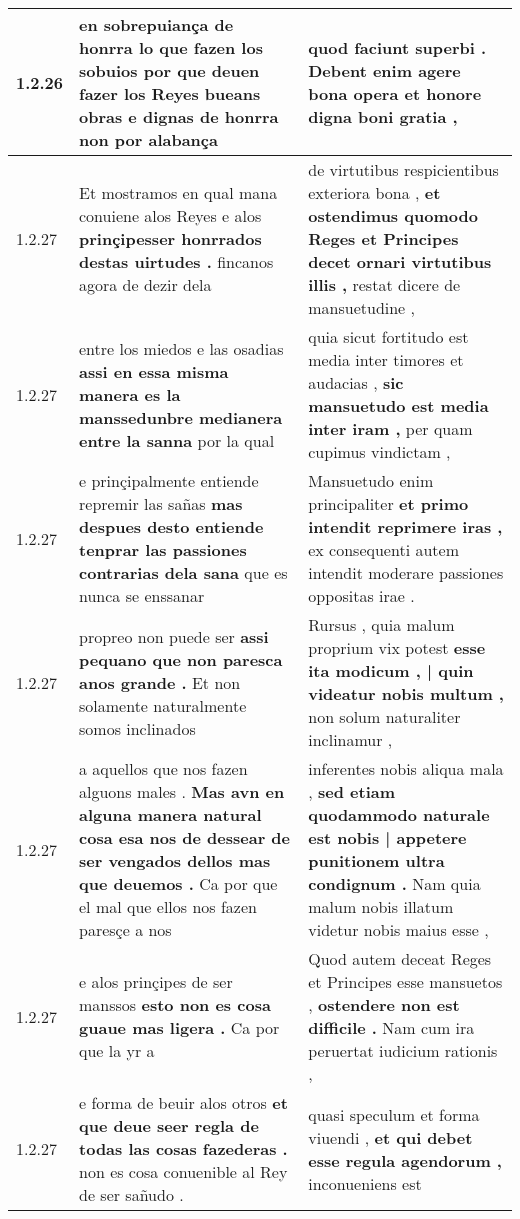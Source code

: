 \begin{tabular}{|p{1cm}|p{6.5cm}|p{6.5cm}|}
1.2.26 & en sobrepuiança de honrra lo que fazen los sobuios \textbf{ por que deuen fazer los Reyes bueans obras e dignas de honrra } non por alabança & quod faciunt superbi . \textbf{ Debent enim agere bona opera } et honore digna boni gratia , \\\hline
1.2.27 & Et mostramos en qual mana conuiene alos Reyes e alos \textbf{ prinçipesser honrrados destas uirtudes . } fincanos agora de dezir dela & de virtutibus respicientibus exteriora bona , \textbf{ et ostendimus quomodo Reges et Principes decet ornari virtutibus illis , } restat dicere de mansuetudine , \\\hline
1.2.27 & entre los miedos e las osadias \textbf{ assi en essa misma manera es la manssedunbre medianera entre la sanna } por la qual & quia sicut fortitudo est media inter timores et audacias , \textbf{ sic mansuetudo est media inter iram , } per quam cupimus vindictam , \\\hline
1.2.27 & e prinçipalmente entiende repremir las sañas \textbf{ mas despues desto entiende tenprar las passiones contrarias dela sana } que es nunca se enssanar & Mansuetudo enim principaliter \textbf{ et primo intendit reprimere iras , } ex consequenti autem intendit moderare passiones oppositas irae . \\\hline
1.2.27 & propreo non puede ser \textbf{ assi pequano que non paresca anos grande . } Et non solamente naturalmente somos inclinados & Rursus , quia malum proprium vix potest \textbf{ esse ita modicum , | quin videatur nobis multum , } non solum naturaliter inclinamur , \\\hline
1.2.27 & a aquellos que nos fazen alguons males . \textbf{ Mas avn en alguna manera natural cosa esa nos de dessear de ser vengados dellos mas que deuemos . } Ca por que el mal que ellos nos fazen paresçe a nos & inferentes nobis aliqua mala , \textbf{ sed etiam quodammodo naturale est nobis | appetere punitionem ultra condignum . } Nam quia malum nobis illatum videtur nobis maius esse , \\\hline
1.2.27 & e alos prinçipes de ser manssos \textbf{ esto non es cosa guaue mas ligera . } Ca por que la yr a & Quod autem deceat Reges et Principes esse mansuetos , \textbf{ ostendere non est difficile . } Nam cum ira peruertat iudicium rationis , \\\hline
1.2.27 & e forma de beuir alos otros \textbf{ et que deue seer regla de todas las cosas fazederas . } non es cosa conuenible al Rey de ser sañudo . & quasi speculum et forma viuendi , \textbf{ et qui debet esse regula agendorum , } inconueniens est \\\hline

\end{tabular}
